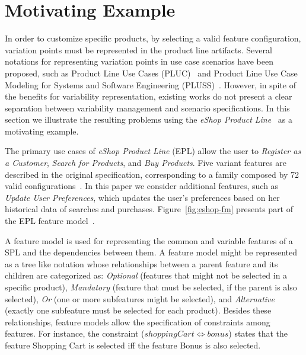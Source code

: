 \documentclass{acm_proc_article-sp}
\begin{document}
\section{Motivating Example}
\label{sec:problem}

In order to customize specific products, by selecting a valid feature
configuration, variation points must be represented in the product line
artifacts. Several notations for representing variation points in use case
scenarios have been proposed, such as Product Line Use Cases
(PLUC)~\cite{Bertolino:2003aa} and Product Line Use Case Modeling for Systems
and Software Engineering (PLUSS)~\cite{eriksson-splc-2005}. However, in spite of
the benefits for variability representation, existing works do not present a
clear separation between variability management and scenario specifications. In this
section we illustrate the resulting problems using the \emph{eShop Product
Line}~\cite{eshop-url} as a motivating example.

The primary use cases of \emph{eShop Product Line} (EPL) allow the user to
\emph{Register as a Customer}, \emph{Search for Products}, and \emph{Buy
Products}.  Five variant features are described in the original specification,
corresponding to a family composed by 72 valid configurations~\cite{eshop-url}.
In this paper we consider additional features, such as \emph{Update User
Preferences}, which updates the user's preferences based on her
historical data of searches and purchases. Figure~\ref{fig:eshop-fm} presents part of the
EPL feature model~\cite{gheyi-alloy-06,Czarnecki:2000aa}.

A feature model is used for representing the common and variable features of a
SPL and the dependencies between them. A feature model might be represented as a tree
like notation whose relationships between a parent feature and its children are
categorized as: \emph{Optional} (features that might not be selected in a
specific product), \emph{Mandatory} (feature that must be selected, if the parent
is also selected), \emph{Or} (one or more subfeatures might be selected), and
\emph{Alternative} (exactly one subfeature must be selected for each product).
Besides these relationships, feature models allow the specification of
constraints among features. For instance, the constraint ($shoppingCart
\Leftrightarrow bonus$) states that the feature Shopping Cart is selected iff
the feature Bonus is also selected.
\end{document}
